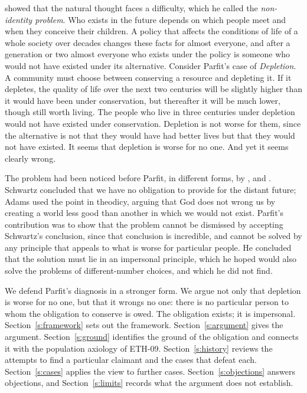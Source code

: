 \documentclass{situationist-preprint}
\begin{document}
\citet[ch.~16]{Parfit1984} showed that the natural thought faces a difficulty, which he called the \emph{non-identity problem}. Who exists in the future depends on which people meet and when they conceive their children. A policy that affects the conditions of life of a whole society over decades changes these facts for almost everyone, and after a generation or two almost everyone who exists under the policy is someone who would not have existed under its alternative. Consider Parfit's case of \emph{Depletion}. A community must choose between conserving a resource and depleting it. If it depletes, the quality of life over the next two centuries will be slightly higher than it would have been under conservation, but thereafter it will be much lower, though still worth living. The people who live in three centuries under depletion would not have existed under conservation. Depletion is not worse for them, since the alternative is not that they would have had better lives but that they would not have existed. It seems that depletion is worse for no one. And yet it seems clearly wrong.

The problem had been noticed before Parfit, in different forms, by \citet{Schwartz1978}, \citet{Adams1979} and \citet{Kavka1982}. Schwartz concluded that we have no obligation to provide for the distant future; Adams used the point in theodicy, arguing that God does not wrong us by creating a world less good than another in which we would not exist. Parfit's contribution was to show that the problem cannot be dismissed by accepting Schwartz's conclusion, since that conclusion is incredible, and cannot be solved by any principle that appeals to what is worse for particular people. He concluded that the solution must lie in an impersonal principle, which he hoped would also solve the problems of different-number choices, and which he did not find.

We defend Parfit's diagnosis in a stronger form. We argue not only that depletion is worse for no one, but that it wrongs no one: there is no particular person to whom the obligation to conserve is owed. The obligation exists; it is impersonal. Section~\ref{s:framework} sets out the framework. Section~\ref{s:argument} gives the argument. Section~\ref{s:ground} identifies the ground of the obligation and connects it with the population axiology of ETH-09. Section~\ref{s:history} reviews the attempts to find a particular claimant and the cases that defeat each. Section~\ref{s:cases} applies the view to further cases. Section~\ref{s:objections} answers objections, and Section~\ref{s:limits} records what the argument does not establish.
\end{document}
